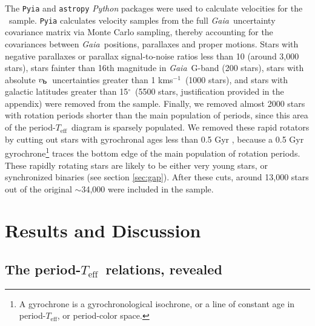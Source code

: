 \documentclass{aastex63}
\newcommand{\gaia}{{\it Gaia}}
\newcommand{\teff}{$T_{\mathrm{eff}}$}
\newcommand{\degrees}{$^\circ$}
\newcommand{\vb}{$v_{\bf b}$}
\newcommand{\kms}{kms$^{-1}$}
\newcommand{\mct}{\citet{mcquillan2014}}
\newcommand{\racomment}[1]{{\color{blue}#1}}
\begin{document}
The {\tt Pyia} \citep{price-whelan_2018} and {\tt astropy} \citep{astropy2013,
astropy2018} {\it Python} packages were used to calculate velocities for the
\mct\ sample.
{\tt Pyia} calculates velocity samples from the full \gaia\ uncertainty
covariance matrix via Monte Carlo sampling, thereby accounting for the
covariances between \gaia\ positions, parallaxes and proper motions.
Stars with negative parallaxes or parallax signal-to-noise ratios less than 10
(around 3,000 stars), stars fainter than 16th magnitude \racomment{in \gaia\
G-band} (200 stars), stars with absolute \vb\ uncertainties greater than 1
\kms\ (1000 stars), and stars with galactic latitudes greater than 15\degrees\
(5500 stars, justification provided in the appendix) were removed from the
sample.
Finally, we removed almost 2000 stars with rotation periods shorter than the
main population of periods, since this area of the period-\teff\ diagram is
sparsely populated.
We removed these rapid rotators by cutting out stars with gyrochronal ages
less than 0.5 Gyr \citep[based on the][gyro-model]{angus2019}, because a 0.5
Gyr gyrochrone\footnote{A gyrochrone is a gyrochronological isochrone, or a
line of constant age in period-\teff, or period-color space.} traces the
bottom edge of the main population of rotation periods.
\racomment{These rapidly rotating stars are likely to be either very young
stars, or synchronized binaries (see section \ref{sec:gap}).}
After these cuts, around 13,000 stars out of the original $\sim$34,000 were
included in the sample.

\section{Results and Discussion}
\label{sec:results}

\subsection{The period-\teff\ relations, revealed}
\label{sec:the_reveal}
\end{document}
